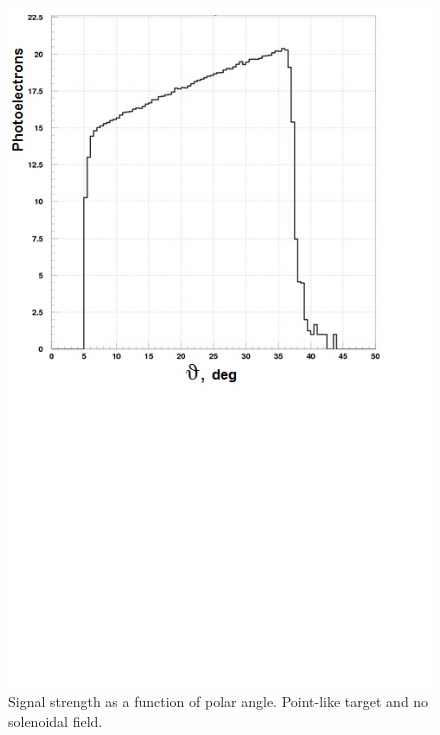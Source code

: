\begin{figure}[!ht]
    \centering
    \includegraphics[width=1.0\linewidth,trim={0.0cm 9.4cm 0.0cm 0.0cm},clip]{images/Point_Targ_Zero_Field_Theta.jpg}
    \caption{Signal strength as a function of polar angle. Point-like target and no solenoidal field.}
    \label{fig:Point_Targ_Zero_Field_Theta}
\end{figure}

